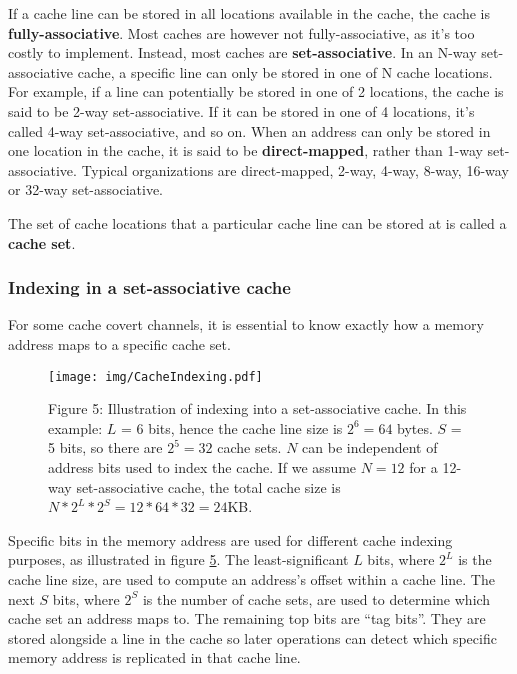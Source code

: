 \documentclass[
  a4paper,
]{report}
\begin{document}
If a cache line can be stored in all locations available in the cache,
the cache is \textbf{fully-associative}.
Most caches are however not fully-associative, as it's too costly to
implement. Instead, most caches are
\textbf{set-associative}. In an N-way
set-associative cache, a specific line can only be stored in one of N
cache locations. For example, if a line can potentially be stored in one
of 2 locations, the cache is said to be 2-way set-associative. If it can
be stored in one of 4 locations, it's called 4-way set-associative, and
so on. When an address can only be stored in one location in the cache,
it is said to be \textbf{direct-mapped},
rather than 1-way set-associative. Typical organizations are
direct-mapped, 2-way, 4-way, 8-way, 16-way or 32-way set-associative.

The set of cache locations that a particular cache line can be stored at
is called a \textbf{cache set}.

\hypertarget{indexing-in-a-set-associative-cache}{%
\subsubsection{Indexing in a set-associative
cache}\label{indexing-in-a-set-associative-cache}}

For some cache covert channels, it is essential to know exactly how a
memory address maps to a specific cache set.

\begin{figure}
\hypertarget{fig:cache-indexing}{%
\centering
\texttt{[image: img/CacheIndexing.pdf]}
\caption{Figure 5: Illustration of indexing into a set-associative
cache. In this example: \(L\) = 6 bits, hence the cache line size is
\(2^6=64\) bytes. \(S\) = 5 bits, so there are \(2^5=32\) cache sets.
\(N\) can be independent of address bits used to index the cache. If we
assume \(N=12\) for a 12-way set-associative cache, the total cache size
is \(N*2^L*2^S=12*64*32=24\)KB.}\label{fig:cache-indexing}
}
\end{figure}

Specific bits in the memory address are used for different cache
indexing purposes, as illustrated in figure
\protect\hyperlink{fig:cache-indexing}{5}. The least-significant \(L\)
bits, where \(2^L\) is the cache line size, are used to compute an
address's offset within a cache line. The next \(S\) bits, where \(2^S\)
is the number of cache sets, are used to determine which cache set an
address maps to. The remaining top bits are ``tag bits''. They are
stored alongside a line in the cache so later operations can detect
which specific memory address is replicated in that cache line.
\end{document}
